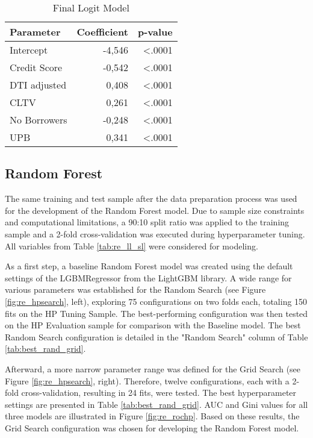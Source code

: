 \begin{table}[H]
\centering
\begin{tabular}{lrr}\toprule
\textbf{Parameter}     	& \textbf{Coefficient} & \textbf{p-value} \\\midrule
Intercept          		& -4,546               & \textless{}.0001 \\
Credit Score       		& -0,542               & \textless{}.0001 \\
DTI adjusted       		& 0,408                & \textless{}.0001 \\
CLTV               		& 0,261                & \textless{}.0001 \\
No Borrowers       		& -0,248               & \textless{}.0001 \\
UPB                		& 0,341                & \textless{}.0001\\\bottomrule
\end{tabular}
\caption{Final Logit Model}
\label{tab:re_finalLogModel}
\end{table}

\subsection{Random Forest}
\label{sec:randfor}
The same training and test sample after the data preparation process was used for the development of the Random Forest model. Due to sample size constraints and computational limitations, a 90:10 split ratio was applied to the training sample and a 2-fold cross-validation was executed during hyperparameter tuning. All variables from Table \ref{tab:re_ll_sl} were considered for modeling.

As a first step, a baseline Random Forest model was created using the default settings of the LGBMRegressor from the LightGBM library. A wide range for various parameters was established for the Random Search (see Figure \ref{fig:re_hpsearch}, left), exploring 75 configurations on two folds each, totaling 150 fits on the HP Tuning Sample. The best-performing configuration was then tested on the HP Evaluation sample for comparison with the Baseline model. The best Random Search configuration is detailed in the "Random Search" column of Table \ref{tab:best_rand_grid}. 

Afterward, a more narrow parameter range was defined for the Grid Search (see Figure \ref{fig:re_hpsearch}, right). Therefore, twelve configurations, each with a 2-fold cross-validation, resulting in 24 fits, were tested. The best hyperparameter settings are presented in Table \ref{tab:best_rand_grid}. AUC and Gini values for all three models are illustrated in Figure \ref{fig:re_rochp}. Based on these results, the Grid Search configuration was chosen for developing the Random Forest model.

